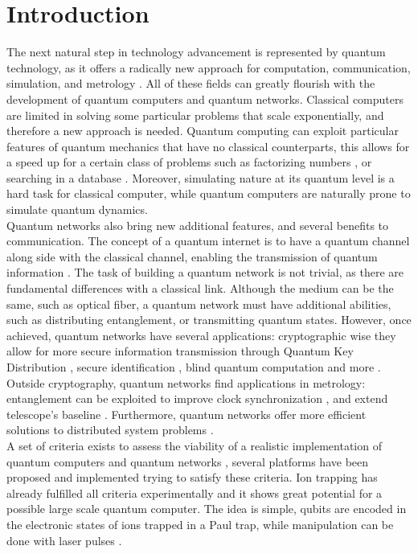 \documentclass[english, a4paper, 12pt, twoside]{book}
\numberwithin{equation}{section} %
\begin{document}
\chapter{Introduction} %
The next natural step in technology advancement is represented by quantum technology, as it offers a radically new approach for computation, communication, simulation, and metrology \cite{quantumtech}. All of these fields can greatly flourish with the development of quantum computers and quantum networks. Classical computers are limited in solving some particular problems that scale exponentially, and therefore a new approach is needed. Quantum computing can exploit particular features of quantum mechanics that have no classical counterparts, this allows for a speed up for a certain class of problems such as factorizing numbers \cite{shor}, or searching in a database \cite{grover}. Moreover, simulating nature at its quantum level is a hard task for classical computer, while quantum computers are naturally prone to simulate quantum dynamics.\\
Quantum networks also bring new additional features, and several benefits to communication. The concept of a quantum internet is to have a quantum channel along side with the classical channel, enabling the transmission of quantum information \cite{Wehnereaam9288}. The task of building a quantum network is not trivial, as there are fundamental differences with a classical link. Although the medium can be the same, such as optical fiber, a quantum network must have additional abilities, such as distributing entanglement, or transmitting quantum states. However, once achieved, quantum networks have several applications: cryptographic wise they allow for more secure information transmission through Quantum Key Distribution \cite{qkd2}, secure identification \cite{secureident}, blind quantum computation \cite{blindcomputation} and more \cite{Wehnereaam9288}. Outside cryptography, quantum networks find applications in metrology: entanglement can be exploited to improve clock synchronization \cite{quantumclocks},
and extend telescope's baseline  \cite{telescope}. Furthermore, quantum networks offer more efficient solutions to distributed system problems \cite{distributedcomputing}.\\
A set of criteria exists to assess the viability of a realistic implementation of quantum computers and quantum networks \cite{divincenzo}, several platforms have been proposed and implemented trying to satisfy these criteria. Ion trapping has already fulfilled all criteria experimentally \cite{trappedions} and it shows great potential for a possible large scale quantum computer. The idea is simple, qubits are encoded in the electronic states of ions trapped in a Paul trap, while manipulation can be done with laser pulses \cite{ionquantumcomputer}.\\
\end{document}
